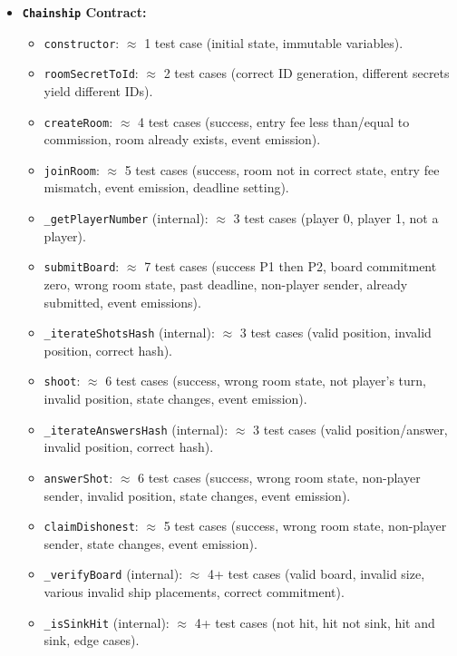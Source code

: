 \documentclass{article}
\begin{document}
    \begin{itemize}
        \item \textbf{\texttt{Chainship} Contract:}
        \begin{itemize}
            \item \texttt{constructor}: \(\approx\) 1 test case (initial state, immutable variables).
            \item \texttt{roomSecretToId}: \(\approx\) 2 test cases (correct ID generation, different secrets yield different IDs).
            \item \texttt{createRoom}: \(\approx\) 4 test cases (success, entry fee less than/equal to commission, room already exists, event emission).
            \item \texttt{joinRoom}: \(\approx\) 5 test cases (success, room not in correct state, entry fee mismatch, event emission, deadline setting).
            \item \texttt{\_getPlayerNumber} (internal): \(\approx\) 3 test cases (player 0, player 1, not a player).
            \item \texttt{submitBoard}: \(\approx\) 7 test cases (success P1 then P2, board commitment zero, wrong room state, past deadline, non-player sender, already submitted, event emissions).
            \item \texttt{\_iterateShotsHash} (internal): \(\approx\) 3 test cases (valid position, invalid position, correct hash).
            \item \texttt{shoot}: \(\approx\) 6 test cases (success, wrong room state, not player's turn, invalid position, state changes, event emission).
            \item \texttt{\_iterateAnswersHash} (internal): \(\approx\) 3 test cases (valid position/answer, invalid position, correct hash).
            \item \texttt{answerShot}: \(\approx\) 6 test cases (success, wrong room state, non-player sender, invalid position, state changes, event emission).
            \item \texttt{claimDishonest}: \(\approx\) 5 test cases (success, wrong room state, non-player sender, state changes, event emission).
            \item \texttt{\_verifyBoard} (internal): \(\approx\) 4+ test cases (valid board, invalid size, various invalid ship placements, correct commitment).
            \item \texttt{\_isSinkHit} (internal): \(\approx\) 4+ test cases (not hit, hit not sink, hit and sink, edge cases).

\end{itemize}
\end{itemize}
\end{document}
